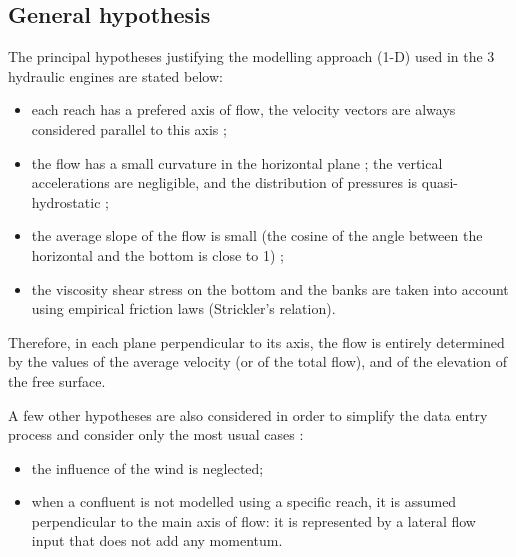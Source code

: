 \subsection{General hypothesis}

The principal hypotheses justifying the modelling approach (1-D) used in the 3
hydraulic engines are stated below:

\vspace{0.5cm}
\begin{itemize}
 \item each reach has a prefered axis of flow, the velocity vectors are always
   considered parallel to this axis ;
 \item the flow has a small curvature in the horizontal plane ; the vertical
   accelerations are negligible, and the distribution of pressures is
   quasi-hydrostatic ;
 \item the average slope of the flow is small (the cosine of the angle between
   the horizontal and the bottom is close to 1) ;
 \item the viscosity shear stress on the bottom and the banks are taken into
   account using empirical friction laws (Strickler's relation).
\end{itemize}

\vspace{0.5cm}



Therefore, in each plane perpendicular to its axis, the flow is entirely determined by the values of the average velocity (or of the total flow), and of the elevation of the free surface.

\vspace{0.5cm}

A few other hypotheses are also considered in order to simplify the data entry process and consider only the most usual cases :
\vspace{0.5cm}
\begin{itemize}
 \item the influence of the wind is neglected;
 \item when a confluent is not modelled using a specific reach, it is assumed perpendicular to the main axis of flow: it is represented by a lateral flow input that does not add any momentum.
\end{itemize}

\vspace{0.5cm}

